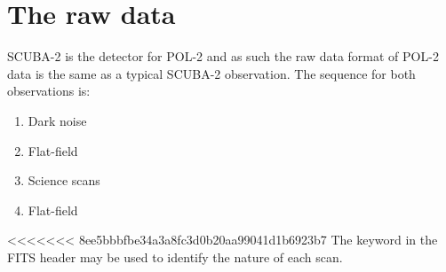 \section{The raw data}
\label{sec:rawdata}
SCUBA-2 is the detector for POL-2 and as such the raw data format of POL-2 data is
the same as a typical SCUBA-2 observation. The sequence for both observations is:

\begin{enumerate}\itemsep-0.2em
\item Dark noise
\item Flat-field
\item Science scans
\item Flat-field
\end{enumerate}

<<<<<<< 8ee5bbbfbe34a3a8fc3d0b20aa99041d1b6923b7
The  keyword in the FITS header may be used to identify the nature of each scan.
